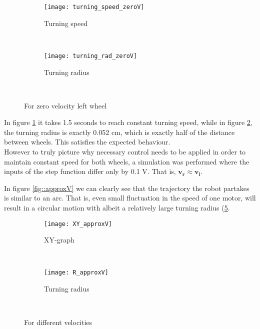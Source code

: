\begin{figure}[h]
    \centering
    \begin{subfigure}[h]{0.47\textwidth}
        \texttt{[image: turning\_speed\_zeroV]}
        \caption{Turning speed}
        \label{fig:TzeroV}
    \end{subfigure}
    ~ %
    \begin{subfigure}[h]{0.47\textwidth}
        \texttt{[image: turning\_rad\_zeroV]}
        \caption{Turning radius}
        \label{fig:RzeroV}
    \end{subfigure}
    ~ %
    \caption{For zero velocity left wheel}\label{fig:zeroV}
\end{figure}

In figure \ref{fig:TzeroV} it takes 1.5 seconds to reach constant turning speed, while in figure \ref{fig:RzeroV}, the turning radius is exactly 0.052 cm, which is exactly half of the distance between wheels. This satisfies the expected behaviour. \\


However to truly picture why necessary control needs to be applied in order to maintain constant speed for both wheels, a simulation was performed where the inputs of the step function differ only by 0.1 V. That is, $\boldsymbol{v_r \approx v_l}$. 

In figure \ref{fig::approxV} we can clearly see that the trajectory the robot partakes is similar to an arc. That is, even small fluctuation in the speed of one motor, will result in a circular motion with albeit a relatively large turning radius (\ref{fig:RapproxV}. 

\newpage

\begin{figure}[h]
    \centering
    \begin{subfigure}[h]{0.47\textwidth}
        \texttt{[image: XY\_approxV]}
        \caption{XY-graph}
        \label{fig:approxV}
    \end{subfigure}
    ~ %
    \begin{subfigure}[h]{0.47\textwidth}
        \texttt{[image: R\_approxV]}
        \caption{Turning radius}
        \label{fig:RapproxV}
    \end{subfigure}
    ~ %
    \caption{For different velocities}\label{fig:approxV}
\end{figure}

